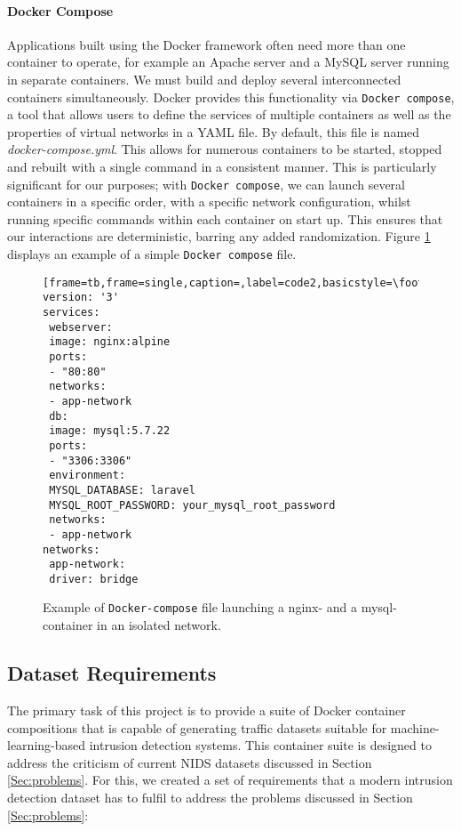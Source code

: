 \paragraph*{Docker Compose}
Applications built using the Docker framework often need more than one container to operate, for example an Apache server and a MySQL server running in separate containers. We must build and deploy several interconnected containers simultaneously. Docker provides this functionality via \texttt{Docker compose}, a tool that allows users to define the services of multiple containers as well as the properties of virtual networks in a YAML file. By default, this file is named \textit{docker-compose.yml}. This allows for numerous containers to be started, stopped and rebuilt with a single command in a consistent manner. This is particularly significant for our purposes; with \texttt{Docker compose}, we can launch several containers in a specific order, with a specific network configuration, whilst running specific commands within each container on start up. This ensures that our interactions are deterministic, barring any added randomization. Figure \ref{fig:dockercompose} displays an example of a simple \texttt{Docker compose} file.

\begin{figure}
\begin{lstlisting}[frame=tb,frame=single,caption=,label=code2,basicstyle=\footnotesize]
version: '3'
services:
 webserver:
 image: nginx:alpine
 ports:
 - "80:80"
 networks:
 - app-network
 db:
 image: mysql:5.7.22
 ports:
 - "3306:3306"
 environment:
 MYSQL_DATABASE: laravel
 MYSQL_ROOT_PASSWORD: your_mysql_root_password
 networks:
 - app-network
networks:
 app-network:
 driver: bridge
\end{lstlisting}
\caption{Example of \texttt{Docker-compose} file launching a nginx- and a mysql-container in an isolated network.}
\label{fig:dockercompose}
\end{figure}{}


\subsection{Dataset Requirements}\label{Sec:require}


The primary task of this project is to provide a suite of Docker container compositions that is capable of generating traffic datasets suitable for machine-learning-based intrusion detection systems. This container suite is designed to address the criticism of current NIDS datasets discussed in Section \ref{Sec:problems}. For this, we created a set of requirements that a modern intrusion detection dataset has to fulfil to address the problems discussed in Section \ref{Sec:problems}:





